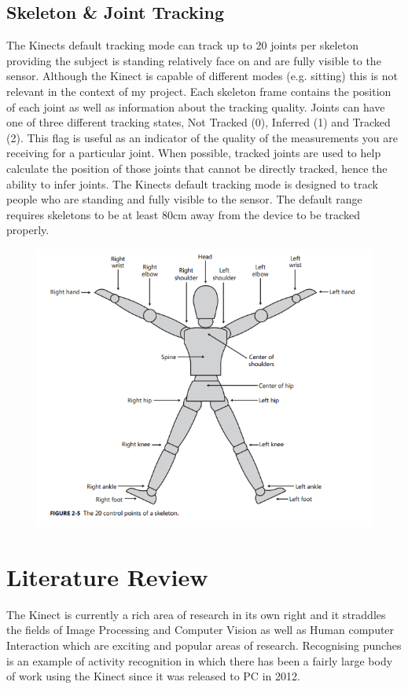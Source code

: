\subsection{Skeleton \& Joint Tracking}
The Kinects default tracking mode can track up to 20 joints per skeleton providing the subject is standing relatively face on and are fully visible to the sensor. Although the Kinect is capable of different modes (e.g. sitting) this is not relevant in the context of my project.
Each skeleton frame contains the position of each joint as well as information about the tracking quality. Joints can have one of three different tracking states,  Not Tracked (0), Inferred (1) and Tracked (2). This flag is useful as an indicator of the quality of the measurements you are receiving for a particular joint. When possible, tracked joints are used to help calculate the position of those joints that cannot be directly tracked, hence the ability to infer joints. The Kinects default tracking mode is designed to track people who are standing and fully visible to the sensor. The default range requires skeletons to be at least 80cm away from the device to be tracked properly.

\begin{figure}[h]
    \centering
    \includegraphics[height=0.40\textheight]{fig02/kinSkel}
    \label{fig:kinskel}
\end{figure}

\section{Literature Review}
The Kinect is currently a rich area of research in its own right and it straddles the fields of Image Processing and Computer Vision as well as Human computer Interaction which are exciting and popular areas of research. Recognising punches is an example of activity recognition in which there has been a fairly large body of work using the Kinect since it was released to PC in 2012.

